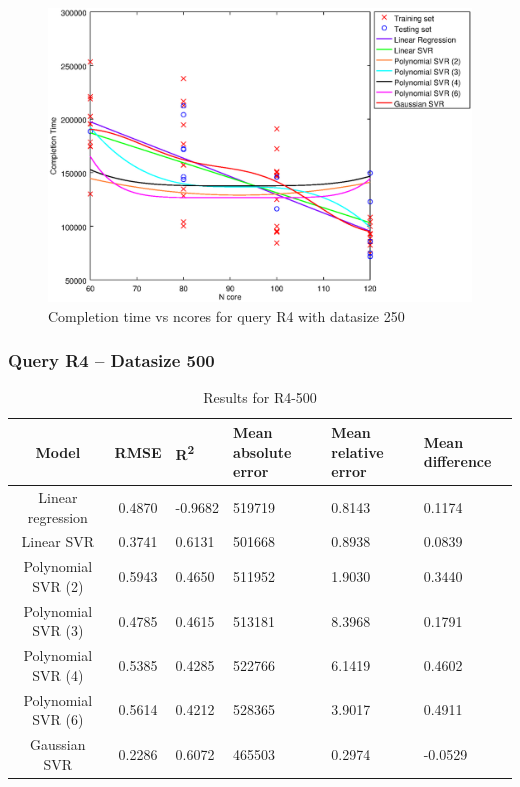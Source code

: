 \documentclass[a4paper,11pt]{article}
\begin{document}
\begin {figure}[hbtp]
\centering
\includegraphics[width=\textwidth]{output/R4_250_ONLY_1_LINEAR_NCORE/plot_R4_250.eps}
\caption{Completion time vs ncores for query R4 with datasize 250}
\label{fig:coreonly_linear_R4_250}
\end {figure}

\newpage
\subsubsection{Query R4 -- Datasize 500}
\begin{table}[H]
	\centering
	\begin{adjustbox}{center}
		\begin{tabular}{c | c M{1.2cm} M{2.5cm} M{2.5cm} M{1.8cm}}
			Model & RMSE & R\textsuperscript{2} & Mean absolute error & Mean relative error & Mean difference \tabularnewline
			\hline
			Linear regression & 0.4870 & -0.9682 & 519719 & 0.8143 & 0.1174 \\
			Linear SVR & 0.3741 & 0.6131 & 501668 & 0.8938 & 0.0839 \\
			Polynomial SVR (2) & 0.5943 & 0.4650 & 511952 & 1.9030 & 0.3440 \\
			Polynomial SVR (3) & 0.4785 & 0.4615 & 513181 & 8.3968 & 0.1791 \\
			Polynomial SVR (4) & 0.5385 & 0.4285 & 522766 & 6.1419 & 0.4602 \\
			Polynomial SVR (6) & 0.5614 & 0.4212 & 528365 & 3.9017 & 0.4911 \\
			Gaussian SVR & 0.2286 & 0.6072 & 465503 & 0.2974 & -0.0529 \\
		\end{tabular}
	\end{adjustbox}
	\\
	\caption{Results for R4-500}
	\label{fig:coreonly_linear_R4_500}
\end{table}
\end{document}
